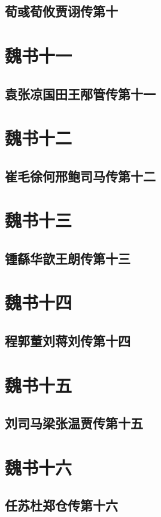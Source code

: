 \documentclass[12pt,UTF8]{ctexbook}
\begin{document}
\chapter{荀彧荀攸贾诩传第十}

\part{魏书十一}
\chapter{袁张凉国田王邴管传第十一}

\part{魏书十二}
\chapter{崔毛徐何邢鲍司马传第十二}

\part{魏书十三}
\chapter{锺繇华歆王朗传第十三}

\part{魏书十四}
\chapter{程郭董刘蒋刘传第十四}

\part{魏书十五}
\chapter{刘司马梁张温贾传第十五}

\part{魏书十六}
\chapter{任苏杜郑仓传第十六}
\end{document}
